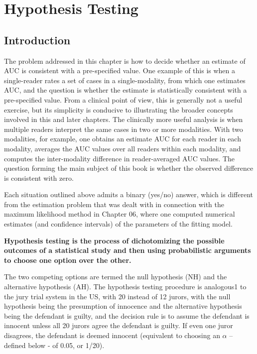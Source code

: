 \documentclass[
]{book}
\begin{document}
\hypertarget{HypothesisTesting}{%
\chapter{Hypothesis Testing}\label{HypothesisTesting}}

\hypertarget{introduction}{%
\section{Introduction}\label{introduction}}

The problem addressed in this chapter is how to decide whether an estimate of AUC is consistent with a pre-specified value. One example of this is when a single-reader rates a set of cases in a single-modality, from which one estimates AUC, and the question is whether the estimate is statistically consistent with a pre-specified value. From a clinical point of view, this is generally not a useful exercise, but its simplicity is conducive to illustrating the broader concepts involved in this and later chapters. The clinically more useful analysis is when multiple readers interpret the same cases in two or more modalities. With two modalities, for example, one obtains an estimate AUC for each reader in each modality, averages the AUC values over all readers within each modality, and computes the inter-modality difference in reader-averaged AUC values. The question forming the main subject of this book is whether the observed difference is consistent with zero.

Each situation outlined above admits a binary (yes/no) answer, which is different from the estimation problem that was dealt with in connection with the maximum likelihood method in Chapter 06, where one computed numerical estimates (and confidence intervals) of the parameters of the fitting model.

\textbf{Hypothesis testing is the process of dichotomizing the possible outcomes of a statistical study and then using probabilistic arguments to choose one option over the other.}

The two competing options are termed the null hypothesis (NH) and the alternative hypothesis (AH). The hypothesis testing procedure is analogous1 to the jury trial system in the US, with 20 instead of 12 jurors, with the null hypothesis being the presumption of innocence and the alternative hypothesis being the defendant is guilty, and the decision rule is to assume the defendant is innocent unless all 20 jurors agree the defendant is guilty. If even one juror disagrees, the defendant is deemed innocent (equivalent to choosing an \(\alpha\) -- defined below - of 0.05, or 1/20).
\end{document}
